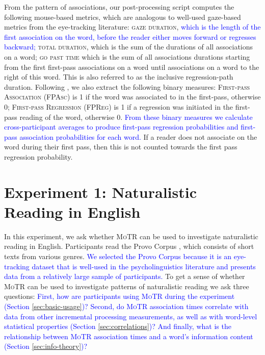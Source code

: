 \documentclass[12pt]{article}
\newcommand{\motr}{\textsc{MoTR}\xspace}
\newcommand{\defn}[1]{\textsc{#1}}
\newcommand{\change}[1]{\textcolor{blue}{#1}}
\begin{document}
From the pattern of associations, our post-processing script computes the following mouse-based metrics, which are analogous to well-used gaze-based metrics from the eye-tracking literature: \defn{gaze duration}, \change{which is the length of the first association on the word, before the reader either moves forward or regresses backward;} \defn{total duration}, which is the sum of the durations of all associations on a word; \defn{go past time} which is the sum of all associations durations starting from the first first-pass associations on a word until associations on a word to the right of this word. This is also referred to as the inclusive regression-path duration. Following \cite{jager2021potec, luke2018provo}, we also extract the following binary measures: \defn{First-pass Association (FPAsc)} is 1 if the word was associated to in the first-pass, otherwise 0; \defn{First-pass Regression (FPReg)} is 1 if a regression was initiated in the first-pass reading of the word, otherwise 0. \change{From these binary measures we calculate cross-participant averages to produce first-pass regression probabilities and first-pass association probabilities for each word.} If a reader does not associate on the word during their first pass, then this is not counted towards the first pass regression probability.

\section{Experiment 1: Naturalistic Reading in English} \label{sec:exp2}

In this experiment, we ask whether \motr can be used to investigate naturalistic reading in English. Participants read the Provo Corpus \citep{luke2018provo}, which consists of short texts from various genres. \change{We selected the Provo Corpus because it is an eye-tracking dataset that is well-used in the psycholinguistics literature and presents data from a relatively large sample of participants.} To get a sense of whether \motr can be used to investigate patterns of naturalistic reading we ask three questions: \change{First, how are participants using \motr during the experiment (Section \ref{sec:basic-usage})? Second, do \motr association times correlate with data from other incremental processing measurements, as well as with word-level statistical properties (Section \ref{sec:correlations})? And finally, what is the relationship between \motr association times and a word's information content (Section \ref{sec:info-theory})?}
\end{document}
